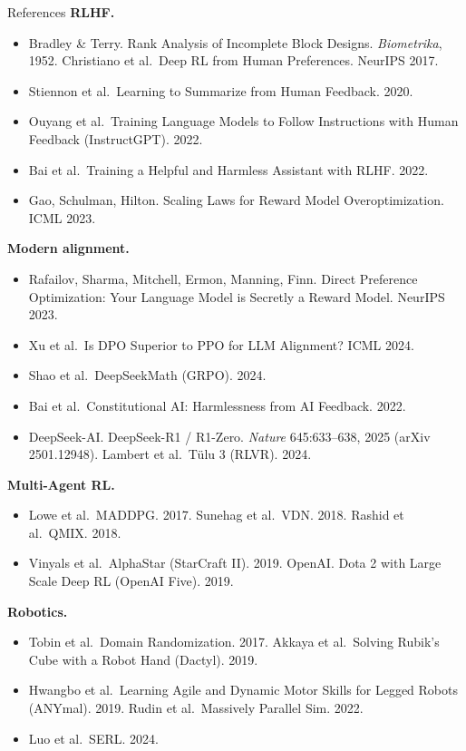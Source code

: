 \begin{frame}[allowframebreaks]{References}
\footnotesize
\textbf{RLHF.}
\begin{itemize}\itemsep0.15em
    \item Bradley \& Terry. Rank Analysis of Incomplete Block Designs.
          \emph{Biometrika}, 1952. \quad Christiano et al.\ Deep RL from Human
          Preferences. NeurIPS 2017.
    \item Stiennon et al.\ Learning to Summarize from Human Feedback. 2020.
    \item Ouyang et al.\ Training Language Models to Follow Instructions with Human
          Feedback (InstructGPT). 2022.
    \item Bai et al.\ Training a Helpful and Harmless Assistant with RLHF. 2022.
    \item Gao, Schulman, Hilton. Scaling Laws for Reward Model Overoptimization.
          ICML 2023.
\end{itemize}
\textbf{Modern alignment.}
\begin{itemize}\itemsep0.15em
    \item Rafailov, Sharma, Mitchell, Ermon, Manning, Finn. Direct Preference
          Optimization: Your Language Model is Secretly a Reward Model. NeurIPS 2023.
    \item Xu et al.\ Is DPO Superior to PPO for LLM Alignment? ICML 2024.
    \item Shao et al.\ DeepSeekMath (GRPO). 2024.
    \item Bai et al.\ Constitutional AI: Harmlessness from AI Feedback. 2022.
    \item DeepSeek-AI. DeepSeek-R1 / R1-Zero. \emph{Nature} 645:633--638, 2025
          (arXiv 2501.12948). \quad Lambert et al.\ T\"ulu 3 (RLVR). 2024.
\end{itemize}
\textbf{Multi-Agent RL.}
\begin{itemize}\itemsep0.15em
    \item Lowe et al.\ MADDPG. 2017. \quad Sunehag et al.\ VDN. 2018. \quad
          Rashid et al.\ QMIX. 2018.
    \item Vinyals et al.\ AlphaStar (StarCraft II). 2019. \quad OpenAI. Dota 2
          with Large Scale Deep RL (OpenAI Five). 2019.
\end{itemize}
\textbf{Robotics.}
\begin{itemize}\itemsep0.15em
    \item Tobin et al.\ Domain Randomization. 2017. \quad Akkaya et al.\ Solving
          Rubik's Cube with a Robot Hand (Dactyl). 2019.
    \item Hwangbo et al.\ Learning Agile and Dynamic Motor Skills for Legged Robots
          (ANYmal). 2019. \quad Rudin et al.\ Massively Parallel Sim. 2022.
    \item Luo et al.\ SERL. 2024.
\end{itemize}


\end{frame}
